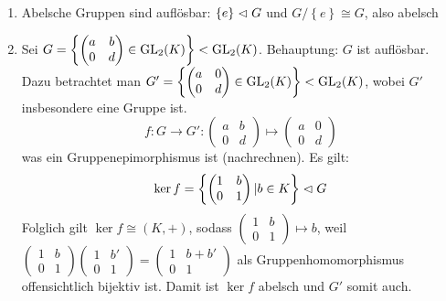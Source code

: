 \documentclass[12pt,a4paper]{scrartcl}
\begin{document}
\begin{bsp}
	\leavevmode
	\begin{enumerate}
		\item Abelsche Gruppen sind auflösbar: $\left\lbrace e \right\rbrace \vartriangleleft G$ und $G/\left\lbrace e \right\rbrace \cong G $, also abelsch
		\item Sei $G = \left\lbrace \begin{pmatrix}
		a & b \\ 
		0 & d
		\end{pmatrix} \in \operatorname{GL}_2(K) \right\rbrace < \operatorname{GL}_2(K) $. Behauptung: $G$ ist auflösbar. Dazu betrachtet man $G' = \left\lbrace \begin{pmatrix}
		a & 0 \\
		0 & d
		\end{pmatrix} \in \operatorname{GL}_2(K)\right\rbrace < \operatorname{GL}_2(K)$, wobei $G'$ insbesondere eine Gruppe ist. 
		\begin{equation*}
			f: G \rightarrow G': \begin{pmatrix}
			a & b \\ 
			0 & d
			\end{pmatrix} \mapsto \begin{pmatrix}
			a & 0 \\ 
			0 & d
			\end{pmatrix}
		\end{equation*}
		was ein Gruppenepimorphismus ist (nachrechnen). Es gilt: 
		\begin{equation*}
			\operatorname{ker} f = \left\lbrace \begin{pmatrix}
			1 & b \\ 
			0 & 1
			\end{pmatrix} \lvert b \in K \right\rbrace \vartriangleleft G
		\end{equation*}
		Folglich gilt $\ker f \cong (K, +)$, sodass $\begin{pmatrix}
		1 & b \\ 
		0 & 1
		\end{pmatrix} \mapsto b$, weil $\begin{pmatrix}
		1 & b \\ 
		0 & 1
		\end{pmatrix}\begin{pmatrix}
		1 & b' \\ 
		0 & 1
		\end{pmatrix}=\begin{pmatrix}
		1 & b + b' \\ 
		0 & 1
		\end{pmatrix}$ als Gruppenhomomorphismus offensichtlich bijektiv ist. Damit ist $\ker f$ abelsch und $G'$ somit auch.

\end{enumerate}
\end{bsp}
\end{document}
